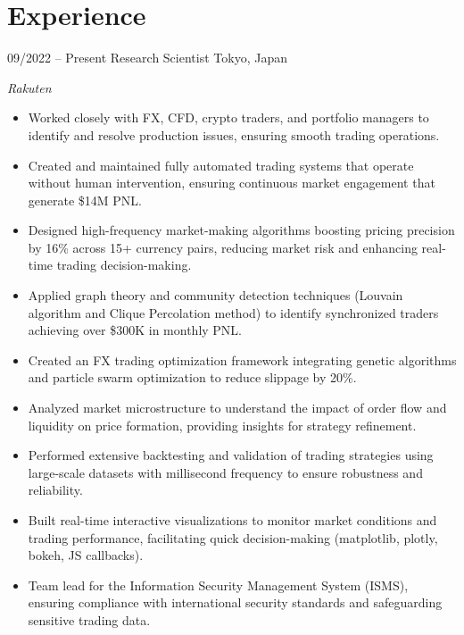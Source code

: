 

\section{Experience}
\begin{entrylist}
\entry
{09/2022 -- Present}
{Research Scientist}
{Tokyo, Japan}
{\emph{Rakuten}
\begin{itemize}
    \item Worked closely with FX, CFD, crypto traders, and portfolio managers to identify and resolve production issues, ensuring smooth trading operations.
    \item Created and maintained fully automated trading systems that operate without human intervention, ensuring continuous market engagement that generate \$14M PNL.
	\item Designed high-frequency market-making algorithms boosting pricing precision by 16\% across 15+ currency pairs, reducing market risk and enhancing real-time trading decision-making.
    \item Applied graph theory and community detection techniques (Louvain algorithm and Clique Percolation method) to identify synchronized traders achieving over \$300K in monthly PNL.
  	\item Created an FX trading optimization framework integrating genetic algorithms and particle swarm optimization to reduce slippage by 20\%.
	\item Analyzed market microstructure to understand the impact of order flow and liquidity on price formation, providing insights for strategy refinement.
    \item Performed extensive backtesting and validation of trading strategies using large-scale datasets with millisecond frequency to ensure robustness and reliability.
	\item Built real-time interactive visualizations to monitor market conditions and trading performance, facilitating quick decision-making (matplotlib, plotly, bokeh, JS callbacks).
 	\item Team lead for the Information Security Management System (ISMS), ensuring compliance with international security standards and safeguarding sensitive trading data.
\end{itemize}
}
\end{entrylist}

